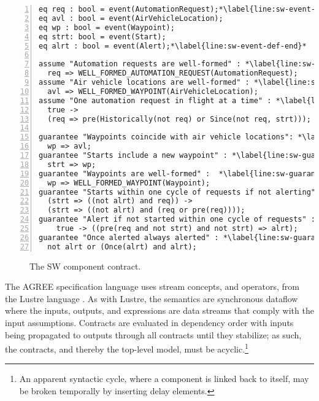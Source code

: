 \newsavebox{\sw}
\begin{lrbox}{\sw}
\begin{lstlisting}[style=agree,numbers=left]
eq req : bool = event(AutomationRequest);*\label{line:sw-event-def-start}*
eq avl : bool = event(AirVehicleLocation);
eq wp : bool = event(Waypoint);
eq strt: bool = event(Start);
eq alrt : bool = event(Alert);*\label{line:sw-event-def-end}*

assume "Automation requests are well-formed" : *\label{line:sw-assume-1}*
  req => WELL_FORMED_AUTOMATION_REQUEST(AutomationRequest);
assume "Air vehicle locations are well-formed" : *\label{line:sw-assume-2}*
  avl => WELL_FORMED_WAYPOINT(AirVehicleLocation);    
assume "One automation request in flight at a time" : *\label{line:sw-assume-3}*
  true -> 
  (req => pre(Historically(not req) or Since(not req, strt)));
      
guarantee "Waypoints coincide with air vehicle locations": *\label{line:sw-guarantee-1}*
  wp => avl;
guarantee "Starts include a new waypoint" : *\label{line:sw-guarantee-2}*
  strt => wp;
guarantee "Waypoints are well-formed" :  *\label{line:sw-guarantee-3}*
  wp => WELL_FORMED_WAYPOINT(Waypoint);
guarantee "Starts within one cycle of requests if not alerting" : *\label{line:sw-guarantee-4}*
  (strt => ((not alrt) and req)) -> 
  (strt => ((not alrt) and (req or pre(req))));
guarantee "Alert if not started within one cycle of requests" : *\label{line:sw-guarantee-5}*
    true -> ((pre(req and not strt) and not strt) => alrt);
guarantee "Once alerted always alerted" : *\label{line:sw-guarantee-6}*
  not alrt or (Once(alrt) and alrt);
\end{lstlisting}
\end{lrbox}

\begin{figure}
  \begin{center}
    \scalebox{0.62}{\usebox{\sw}}
  \end{center}
  \caption{The SW component contract.}
  \label{fig:sw}
\end{figure}

The AGREE specification language uses stream concepts, and operators, from the Lustre language \cite{10.1145/41625.41641}.
As with Lustre, the semantics are synchronous dataflow where the inputs, outputs, and expressions are data streams that comply with the input assumptions.
Contracts are evaluated in dependency order with inputs being propagated to outputs through all contracts until they stabilize; as such, the contracts, and thereby the top-level model, must be acyclic.\footnote{An apparent syntactic cycle, where a component is linked back to itself, may be broken temporally by inserting delay elements.}

